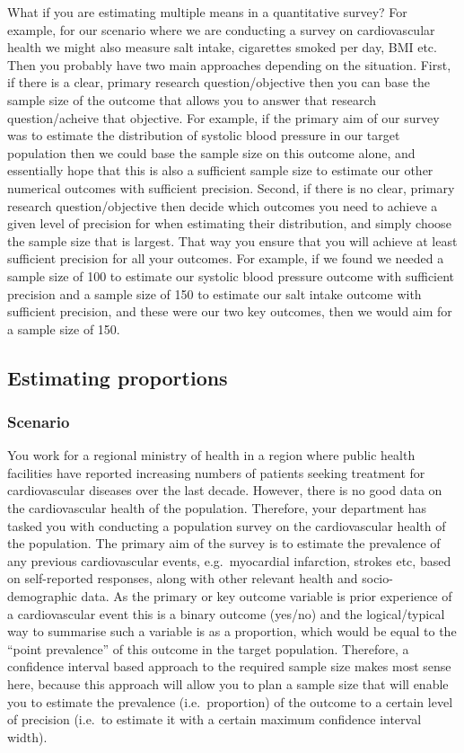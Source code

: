 \documentclass[
]{book}
\begin{document}
What if you are estimating multiple means in a quantitative survey? For example, for our scenario where we are conducting a survey on cardiovascular health we might also measure salt intake, cigarettes smoked per day, BMI etc. Then you probably have two main approaches depending on the situation. First, if there is a clear, primary research question/objective then you can base the sample size of the outcome that allows you to answer that research question/acheive that objective. For example, if the primary aim of our survey was to estimate the distribution of systolic blood pressure in our target population then we could base the sample size on this outcome alone, and essentially hope that this is also a sufficient sample size to estimate our other numerical outcomes with sufficient precision. Second, if there is no clear, primary research question/objective then decide which outcomes you need to achieve a given level of precision for when estimating their distribution, and simply choose the sample size that is largest. That way you ensure that you will achieve at least sufficient precision for all your outcomes. For example, if we found we needed a sample size of 100 to estimate our systolic blood pressure outcome with sufficient precision and a sample size of 150 to estimate our salt intake outcome with sufficient precision, and these were our two key outcomes, then we would aim for a sample size of 150.

\hypertarget{estimating-proportions}{%
\subsection{Estimating proportions}\label{estimating-proportions}}

\hypertarget{scenario-4}{%
\subsubsection{Scenario}\label{scenario-4}}

You work for a regional ministry of health in a region where public health facilities have reported increasing numbers of patients seeking treatment for cardiovascular diseases over the last decade. However, there is no good data on the cardiovascular health of the population. Therefore, your department has tasked you with conducting a population survey on the cardiovascular health of the population. The primary aim of the survey is to estimate the prevalence of any previous cardiovascular events, e.g.~myocardial infarction, strokes etc, based on self-reported responses, along with other relevant health and socio-demographic data. As the primary or key outcome variable is prior experience of a cardiovascular event this is a binary outcome (yes/no) and the logical/typical way to summarise such a variable is as a proportion, which would be equal to the ``point prevalence'' of this outcome in the target population. Therefore, a confidence interval based approach to the required sample size makes most sense here, because this approach will allow you to plan a sample size that will enable you to estimate the prevalence (i.e.~proportion) of the outcome to a certain level of precision (i.e.~to estimate it with a certain maximum confidence interval width).
\end{document}
